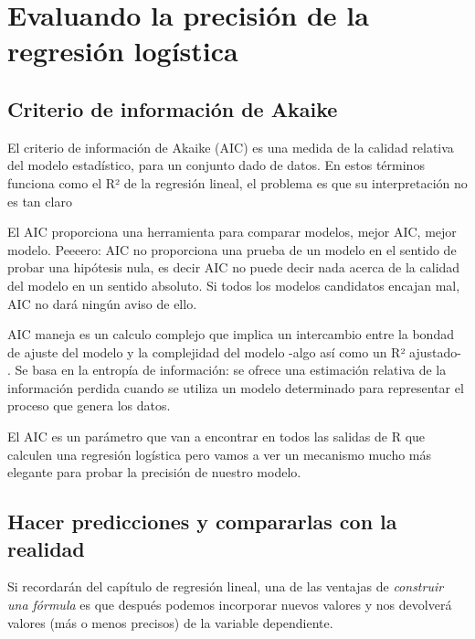 \documentclass[
]{book}
\begin{document}
\hypertarget{evaluando-la-precisiuxf3n-de-la-regresiuxf3n-loguxedstica}{%
\section{Evaluando la precisión de la regresión logística}\label{evaluando-la-precisiuxf3n-de-la-regresiuxf3n-loguxedstica}}

\hypertarget{criterio-de-informaciuxf3n-de-akaike}{%
\subsection{Criterio de información de Akaike}\label{criterio-de-informaciuxf3n-de-akaike}}

El criterio de información de Akaike (AIC) es una medida de la calidad relativa del modelo estadístico, para un conjunto dado de datos. En estos términos funciona como el R² de la regresión lineal, el problema es que su interpretación no es tan claro

El AIC proporciona una herramienta para comparar modelos, mejor AIC, mejor modelo. Peeeero: AIC no proporciona una prueba de un modelo en el sentido de probar una hipótesis nula, es decir AIC no puede decir nada acerca de la calidad del modelo en un sentido absoluto. Si todos los modelos candidatos encajan mal, AIC no dará ningún aviso de ello.

AIC maneja es un calculo complejo que implica un intercambio entre la bondad de ajuste del modelo y la complejidad del modelo -algo así como un R² ajustado- . Se basa en la entropía de información: se ofrece una estimación relativa de la información perdida cuando se utiliza un modelo determinado para representar el proceso que genera los datos.

El AIC es un parámetro que van a encontrar en todos las salidas de R que calculen una regresión logística pero vamos a ver un mecanismo mucho más elegante para probar la precisión de nuestro modelo.

\hypertarget{hacer-predicciones-y-compararlas-con-la-realidad}{%
\subsection{Hacer predicciones y compararlas con la realidad}\label{hacer-predicciones-y-compararlas-con-la-realidad}}

Si recordarán del capítulo de regresión lineal, una de las ventajas de \emph{construir una fórmula} es que después podemos incorporar nuevos valores y nos devolverá valores (más o menos precisos) de la variable dependiente.
\end{document}
